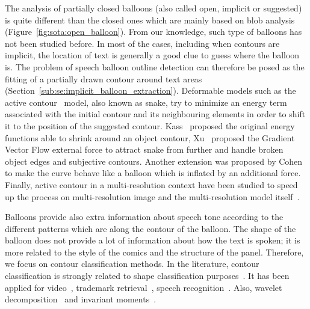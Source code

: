 The analysis of partially closed balloons (also called open, implicit or suggested) is quite different than the closed ones which are mainly based on blob analysis (Figure~\ref{fig:sota:open_balloon}).
From our knowledge, such type of balloons has not been studied before.
In most of the cases, including when contours are implicit, the location of text is generally a good clue to guess where the balloon is.
The problem of speech balloon outline detection can therefore be posed as the fitting of a partially drawn contour around text areas (Section~\ref{sub:se:implicit_balloon_extraction}).
Deformable models such as the active contour~\cite{Kass1988} model, also known as snake, try to minimize an energy term associated with the initial contour and its neighbouring elements in order to shift it to the position of the suggested contour.
Kass~\cite{Kass1988} proposed the original energy functions able to shrink around an object contour, Xu~\cite{Xu1998} proposed the Gradient Vector Flow external force to attract snake from further and handle broken object edges and subjective contours.
Another extension was proposed by Cohen~\cite{Cohen1991} to make the curve behave like a balloon which is inflated by an additional force.
Finally, active contour in a multi-resolution context have been studied to speed up the process on multi-resolution image and the multi-resolution model itself~\cite{Leroy1996}.


Balloons provide also extra information about speech tone according to the different patterns which are along the contour of the balloon.
The shape of the balloon does not provide a lot of information about how the text is spoken; it is more related to the style of the comics and the structure of the panel.
Therefore, we focus on contour classification methods.
In the literature, contour classification is strongly related to shape classification purposes~\cite{sun2005classification,liu1990partial}.
It has been applied for video~\cite{kuhne2001motion,richter2001contour,bader2009}, trademark retrieval~\cite{leung2002trademark}, speech recognition~\cite{grigoriu1994automatic}.
Also, wavelet decomposition~\cite{tieng1997recognition} and invariant moments~\cite{mukundan1998moment}. 

